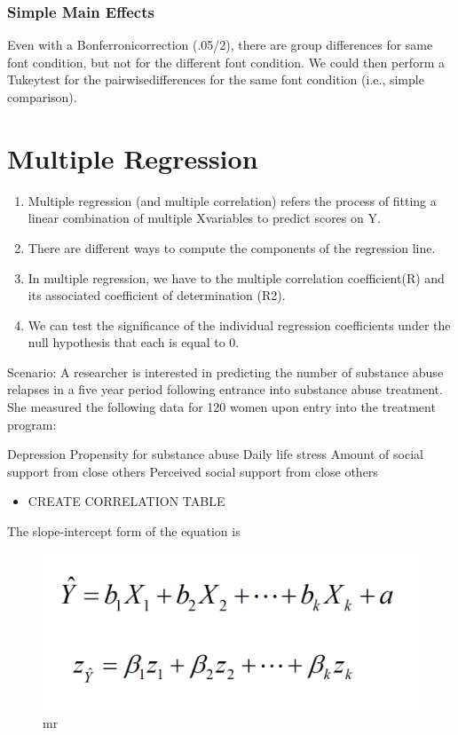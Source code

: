 \documentclass[]{book}
\providecommand{\tightlist}{%
  \setlength{\itemsep}{0pt}\setlength{\parskip}{0pt}}
\theoremstyle{definition}
\theoremstyle{definition}
\theoremstyle{definition}
\theoremstyle{remark}
\begin{document}
\subsection{Simple Main Effects}\label{simple-main-effects}

Even with a Bonferronicorrection (.05/2), there are group differences
for same font condition, but not for the different font condition. We
could then perform a Tukeytest for the pairwisedifferences for the same
font condition (i.e., simple comparison).

\chapter{Multiple Regression}\label{multiple-regression}

\begin{enumerate}
\def\labelenumi{\arabic{enumi}.}
\tightlist
\item
  Multiple regression (and multiple correlation) refers the process of
  fitting a linear combination of multiple Xvariables to predict scores
  on Y.
\item
  There are different ways to compute the components of the regression
  line.
\item
  In multiple regression, we have to the multiple correlation
  coefficient(R) and its associated coefficient of determination (R2).
\item
  We can test the significance of the individual regression coefficients
  under the null hypothesis that each is equal to 0.
\end{enumerate}

Scenario: A researcher is interested in predicting the number of
substance abuse relapses in a five year period following entrance into
substance abuse treatment. She measured the following data for 120 women
upon entry into the treatment program:

Depression Propensity for substance abuse Daily life stress Amount of
social support from close others Perceived social support from close
others

\begin{itemize}
\tightlist
\item
  CREATE CORRELATION TABLE
\end{itemize}

The slope-intercept form of the equation is

\begin{figure}
\centering
\includegraphics{img/hicksmr1.png}
\caption{mr}
\end{figure}
\end{document}
